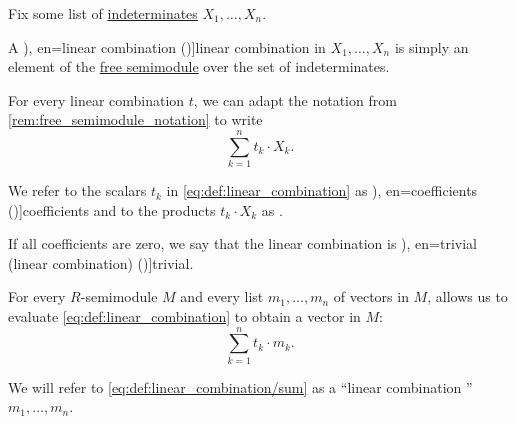 \begin{definition}\label{def:linear_combination}\mimprovised
  Fix some list of \hyperref[con:indeterminate]{indeterminates} \( X_1, \ldots, X_n \).

  A \term[ru=линейная комбинация (\cite[\S 3.2]{Тыртышников2007ЛинейнаяАлгебра}), en=linear combination (\cite[39]{FriedbergInselSpence2018LinearAlgebra})]{linear combination} in \( X_1, \ldots, X_n \) is simply an element of the \hyperref[def:free_semimodule]{free semimodule} over the set of indeterminates.

  For every linear combination \( t \), we can adapt the notation from \cref{rem:free_semimodule_notation} to write
  \begin{equation}\label{eq:def:linear_combination}
    \sum_{k=1}^n t_k \cdot X_k.
  \end{equation}

  We refer to the scalars \( t_k \) in \eqref{eq:def:linear_combination} as \term[ru=коэффициенты (линейной комбинации) (\cite[\S 3.2]{Тыртышников2007ЛинейнаяАлгебра}), en=coefficients (\cite[39]{FriedbergInselSpence2018LinearAlgebra})]{coefficients} and to the products \( t_k \cdot X_k \) as .

  \begin{thmenum}
     If all coefficients are zero, we say that the linear combination is \term[ru=тривиальная (линейная комбинация) (\cite[\S 3.3]{Тыртышников2007ЛинейнаяАлгебра}), en=trivial (linear combination) (\cite[8]{Treil2017LinearAlgebraDoneWrong})]{trivial}.

     For every \( R \)-semimodule \( M \) and every list \( m_1, \ldots, m_n \) of vectors in \( M \),  allows us to evaluate \eqref{eq:def:linear_combination} to obtain a vector in \( M \):
    \begin{equation}\label{eq:def:linear_combination/sum}
      \sum_{k=1}^n t_k \cdot m_k.
    \end{equation}

    We will refer to \eqref{eq:def:linear_combination/sum} as a \enquote{linear combination } \( m_1, \ldots, m_n \).
  \end{thmenum}
\end{definition}
